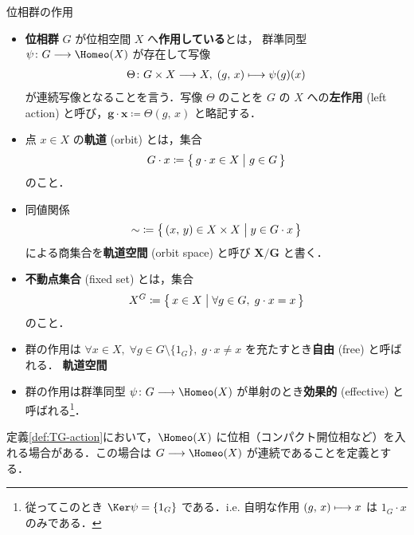 \documentclass[algtopo_main]{subfiles}
\begin{document}
\begin{mydef}[label=def:TG-action, breakable]{位相群の作用}
    \begin{itemize}
        \item \textbf{位相群} $G$ が位相空間 $X$ へ\textbf{作用している}とは，
        群準同型 $\psi \colon G \lto \Homeo(X)$ が存在して写像
        \begin{align}
            \Theta \colon G \times X \longrightarrow X,\; (g,\, x) \longmapsto \psi(g)(x)
        \end{align}
        が連続写像となることを言う．写像 $\Theta$ のことを $G$ の $X$ への\textbf{左作用} (left action) と呼び，$\bm{g \cdot x} \coloneqq \Theta(g,\, x)$ と略記する．
        \item 点 $x \in X$ の\textbf{軌道} (orbit) とは，集合
        \begin{align}
            G \cdot x \coloneqq \bigl\{\, g \cdot x \in X\bigm| g \in G \,\bigr\} 
        \end{align}
        のこと．
        \item 同値関係
        \begin{align}
            \sim\; \coloneqq \bigl\{\, (x,\, y) \in X \times X \bigm| y \in G \cdot x \,\bigr\} 
        \end{align}
        による商集合を\textbf{軌道空間} (orbit space) と呼び $\bm{X/G}$ と書く．
        \item \textbf{不動点集合} (fixed set) とは，集合
        \begin{align}
            X^G \coloneqq \bigl\{\, x \in X \bigm| \forall g\in G,\; g \cdot x = x \,\bigr\} 
        \end{align}
        のこと．
        \item 群の作用は $\forall x \in X,\; \forall g \in G \setminus \{1_G\},\; g \cdot x \neq x$ を充たすとき\textbf{自由} (free) と呼ばれる．
        \textbf{軌道空間}
        \item 群の作用は群準同型 $\psi \colon G \lto \Homeo(X)$ が単射のとき\textbf{効果的} (effective) と呼ばれる\footnote{従ってこのとき $\Ker \psi = \{1_G\}$ である．i.e. 自明な作用 $(g,\, x) \longmapsto x$ は $1_G \cdot x$ のみである．}．
    \end{itemize}
\end{mydef}

\begin{marker}
    定義\ref{def:TG-action}において，$\Homeo(X)$ に位相（コンパクト開位相など）を入れる場合がある．この場合は $G \lto \Homeo(X)$ が連続であることを定義とする．
\end{marker}
\end{document}
